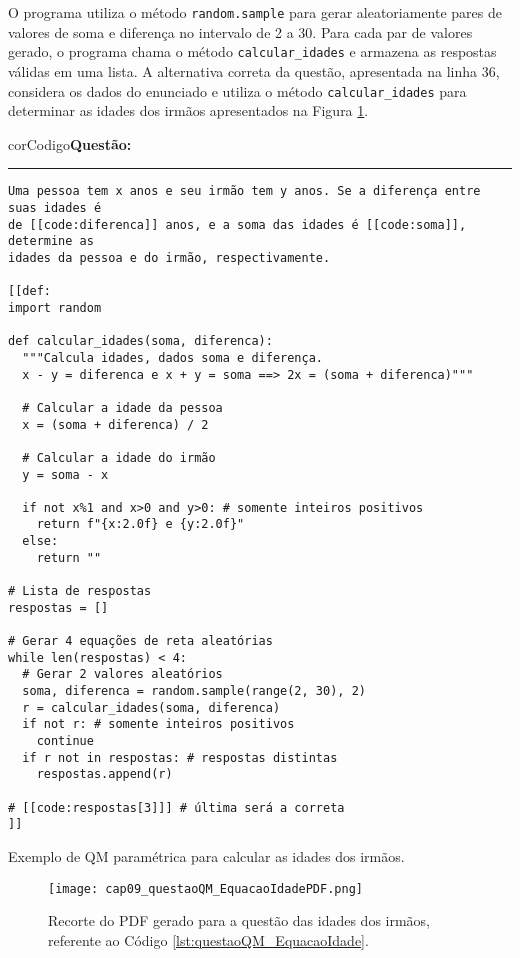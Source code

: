 O programa utiliza o método \verb|random.sample| para gerar aleatoriamente pares de valores de soma e diferença no intervalo de 2 a 30. Para cada par de valores gerado, o programa chama o método \verb|calcular_idades| e armazena as respostas válidas em uma lista. A alternativa correta da questão, apresentada na linha 36, considera os dados do enunciado e utiliza o método \verb|calcular_idades| para determinar as idades dos irmãos apresentados na Figura \ref{fig:cap09_questaoQM_EquacaoIdadePDFb}.

\begin{listing}[!ht]
\begin{myboxCode}{corCodigo}{\textbf{Questão: }}\vspace{3mm}
\hrule
\begin{verbatim}
Uma pessoa tem x anos e seu irmão tem y anos. Se a diferença entre suas idades é 
de [[code:diferenca]] anos, e a soma das idades é [[code:soma]], determine as 
idades da pessoa e do irmão, respectivamente. 

[[def: 
import random

def calcular_idades(soma, diferenca):
  """Calcula idades, dados soma e diferença.
  x - y = diferenca e x + y = soma ==> 2x = (soma + diferenca)"""

  # Calcular a idade da pessoa
  x = (soma + diferenca) / 2

  # Calcular a idade do irmão
  y = soma - x

  if not x%1 and x>0 and y>0: # somente inteiros positivos
    return f"{x:2.0f} e {y:2.0f}"
  else:
    return ""

# Lista de respostas
respostas = []

# Gerar 4 equações de reta aleatórias
while len(respostas) < 4:
  # Gerar 2 valores aleatórios
  soma, diferenca = random.sample(range(2, 30), 2)
  r = calcular_idades(soma, diferenca)
  if not r: # somente inteiros positivos
    continue
  if r not in respostas: # respostas distintas
    respostas.append(r)
    
# [[code:respostas[3]]] # última será a correta
]]
\end{verbatim}
\end{myboxCode}
\caption{Exemplo de QM paramétrica para calcular as idades dos irmãos.}
\label{lst:questaoQM_EquacaoIdade}
\end{listing}

\begin{figure}[!ht]
  \texttt{[image: cap09\_questaoQM\_EquacaoIdadePDF.png]}
  \caption{Recorte do PDF gerado para a questão das idades dos irmãos, referente ao Código \ref{lst:questaoQM_EquacaoIdade}.}
  \label{fig:cap09_questaoQM_EquacaoIdadePDFb}
\end{figure}

